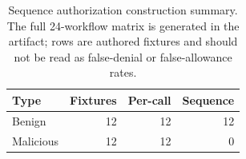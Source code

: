 \begin{table}[t]
  \caption{Sequence authorization construction summary. The full 24-workflow
  matrix is generated in the artifact; rows are authored fixtures and should
  not be read as false-denial or false-allowance rates.}
  \label{tab:sequence-summary}
  \centering\footnotesize
  \begin{tabular}{@{}lrrr@{}}
    \toprule
    Type & Fixtures & Per-call & Sequence \\
    \midrule
    Benign & 12 & 12 & 12 \\
    Malicious & 12 & 12 & 0 \\
    \bottomrule
  \end{tabular}
\end{table}
